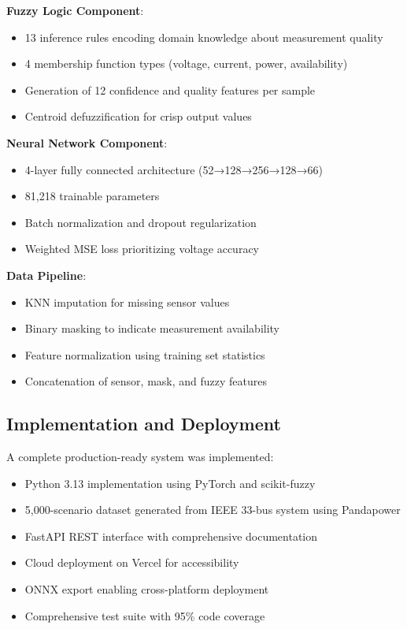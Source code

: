 \documentclass[12pt,a4paper]{report}
\begin{document}
\textbf{Fuzzy Logic Component}:
\begin{itemize}
    \item 13 inference rules encoding domain knowledge about measurement quality
    \item 4 membership function types (voltage, current, power, availability)
    \item Generation of 12 confidence and quality features per sample
    \item Centroid defuzzification for crisp output values
\end{itemize}

\textbf{Neural Network Component}:
\begin{itemize}
    \item 4-layer fully connected architecture (52→128→256→128→66)
    \item 81,218 trainable parameters
    \item Batch normalization and dropout regularization
    \item Weighted MSE loss prioritizing voltage accuracy
\end{itemize}

\textbf{Data Pipeline}:
\begin{itemize}
    \item KNN imputation for missing sensor values
    \item Binary masking to indicate measurement availability
    \item Feature normalization using training set statistics
    \item Concatenation of sensor, mask, and fuzzy features
\end{itemize}

\subsection{Implementation and Deployment}

A complete production-ready system was implemented:

\begin{itemize}
    \item Python 3.13 implementation using PyTorch and scikit-fuzzy
    \item 5,000-scenario dataset generated from IEEE 33-bus system using Pandapower
    \item FastAPI REST interface with comprehensive documentation
    \item Cloud deployment on Vercel for accessibility
    \item ONNX export enabling cross-platform deployment
    \item Comprehensive test suite with 95\% code coverage
\end{itemize}
\end{document}
